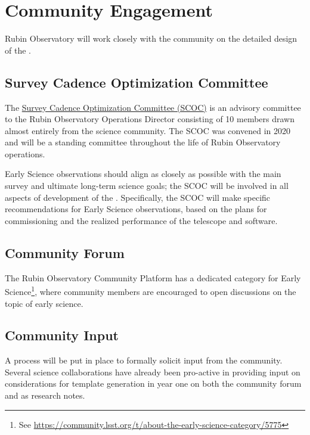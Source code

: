 \section{Community Engagement}

Rubin Observatory will work closely with the community on the detailed design of the \esp. 

\subsection{Survey Cadence Optimization Committee}
The \href{https://www.lsst.org/content/charge-survey-cadence-optimization-committee-scoc}{Survey Cadence Optimization Committee (SCOC)} is an advisory committee to the Rubin Observatory Operations Director consisting of 10 members drawn almost entirely from the science community.
The SCOC was convened in 2020 and will be a standing committee throughout the life of Rubin Observatory operations. 

Early Science observations should align as closely as possible with the main survey and ultimate long-term science goals; the SCOC will be involved in all aspects of development of the \esp. 
Specifically, the SCOC will make specific recommendations for Early Science observations, based on the plans for commissioning and the realized performance of the telescope and software. 


\subsection{Community Forum}

The Rubin Observatory Community Platform has a dedicated category for Early Science\footnote{ See \url{https://community.lsst.org/t/about-the-early-science-category/5775}}, where community members are encouraged to open discussions on the topic of early science. 

\subsection{Community Input}

A process will be put in place to formally solicit input from the community. 
Several science collaborations have already been pro-active in providing input on considerations for template generation in year one on both the community forum and as research notes.